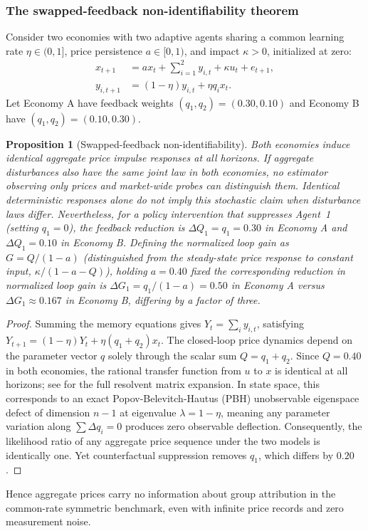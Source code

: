 \documentclass[10pt,twocolumn,letterpaper]{article}
\newtheorem{proposition}[theorem]{Proposition}
\theoremstyle{definition}
\theoremstyle{remark}
\begin{document}
\subsubsection{The swapped-feedback non-identifiability theorem}
Consider two economies with two adaptive agents sharing a common learning rate $\eta\in(0,1]$, price persistence $a\in[0,1)$, and impact $\kappa>0$, initialized at zero:
\begin{align}
 x_{t+1}&=a x_t+\sum_{i=1}^2 y_{i,t}+\kappa u_t+e_{t+1},\\
 y_{i,t+1}&=(1-\eta)y_{i,t}+\eta q_i x_t.
\end{align}
Let Economy A have feedback weights $(q_1,q_2)=(0.30,0.10)$ and Economy B have $(q_1,q_2)=(0.10,0.30)$.
\begin{proposition}[Swapped-feedback non-identifiability]
\label{prop:swapped_feedback}
Both economies induce identical aggregate price impulse responses at all horizons. If aggregate disturbances also have the same joint law in both economies, no estimator observing only prices and market-wide probes can distinguish them. Identical deterministic responses alone do not imply this stochastic claim when disturbance laws differ.
Nevertheless, for a policy intervention that suppresses Agent~1 (setting $q_1=0$), the feedback reduction is $\Delta Q_1 = q_1 = 0.30$ in Economy A and $\Delta Q_1 = 0.10$ in Economy B. Defining the normalized loop gain as $G = Q / (1 - a)$ (distinguished from the steady-state price response to constant input, $\kappa / (1 - a - Q)$), holding $a = 0.40$ fixed the corresponding reduction in normalized loop gain is $\Delta G_1 = q_1 / (1 - a) = 0.50$ in Economy A versus $\Delta G_1 \approx 0.167$ in Economy B, differing by a factor of three.
\end{proposition}
\begin{proof}
Summing the memory equations gives $Y_t=\sum_i y_{i,t}$, satisfying $Y_{t+1}=(1-\eta)Y_t+\eta(q_1+q_2)x_t$. The closed-loop price dynamics depend on the parameter vector $q$ solely through the scalar sum $Q=q_1+q_2$. Since $Q=0.40$ in both economies, the rational transfer function from $u$ to $x$ is identical at all horizons; see  for the full resolvent matrix expansion. In state space, this corresponds to an exact Popov-Belevitch-Hautus (PBH) unobservable eigenspace defect of dimension $n-1$ at eigenvalue $\lambda=1-\eta$, meaning any parameter variation along $\sum \Delta q_i=0$ produces zero observable deflection. Consequently, the likelihood ratio of any aggregate price sequence under the two models is identically one. Yet counterfactual suppression removes $q_1$, which differs by $0.20$.
\end{proof}
Hence aggregate prices carry no information about group attribution in the common-rate symmetric benchmark, even with infinite price records and zero measurement noise.
\end{document}
